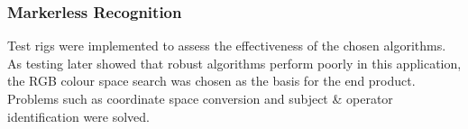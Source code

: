 \subsubsection{Markerless Recognition}
Test rigs were implemented to assess the effectiveness of the chosen algorithms. As testing later showed that robust algorithms perform poorly in this application, the RGB colour space search was chosen as the basis for the end product. Problems such as coordinate space conversion and subject \& operator identification were solved.
